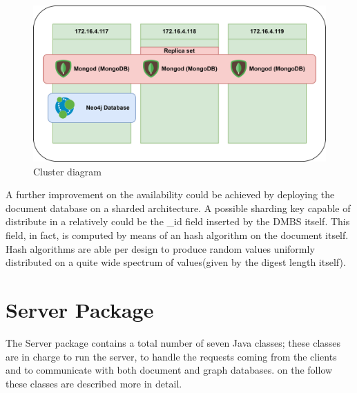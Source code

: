 \documentclass[11pt]{report}
\begin{document}
\begin{figure}[ht]
  \centering
  \includegraphics[width=\textwidth,keepaspectratio=true]{img/cluster_diagram.png}
  \caption{Cluster diagram}
\end{figure}
A further improvement on the availability could be achieved by deploying the document database on a sharded architecture. A possible sharding key capable of distribute in a relatively could be the \_id field inserted by the DMBS itself. This field, in fact, is computed by means of an hash algorithm on the document itself. Hash algorithms are able per design to produce random values uniformly distributed on a quite wide spectrum of values(given by the digest length itself). 
\newpage
 
\section{Server Package}
The Server package contains a total number of seven Java classes; these classes are in charge to run the server, to handle the requests coming from the clients and to communicate with both document and graph databases. on the follow these classes are described more in detail.
\end{document}
